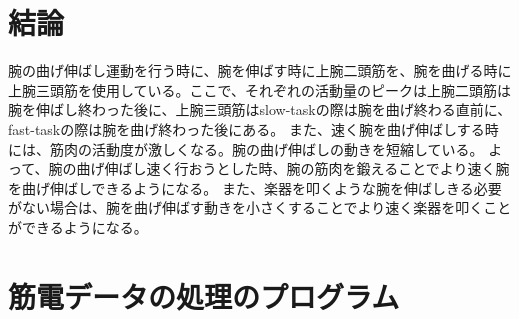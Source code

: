 \documentclass{jsarticle}
\begin{document}
%
%




\section{結論}
腕の曲げ伸ばし運動を行う時に、腕を伸ばす時に上腕二頭筋を、腕を曲げる時に上腕三頭筋を使用している。ここで、それぞれの活動量のピークは上腕二頭筋は腕を伸ばし終わった後に、上腕三頭筋はslow-taskの際は腕を曲げ終わる直前に、fast-taskの際は腕を曲げ終わった後にある。
また、速く腕を曲げ伸ばしする時には、筋肉の活動度が激しくなる。腕の曲げ伸ばしの動きを短縮している。
よって、腕の曲げ伸ばし速く行おうとした時、腕の筋肉を鍛えることでより速く腕を曲げ伸ばしできるようになる。
また、楽器を叩くような腕を伸ばしきる必要がない場合は、腕を曲げ伸ばす動きを小さくすることでより速く楽器を叩くことができるようになる。




\newpage
\appendix

\section{筋電データの処理のプログラム\label{prog1}}
\end{document}
